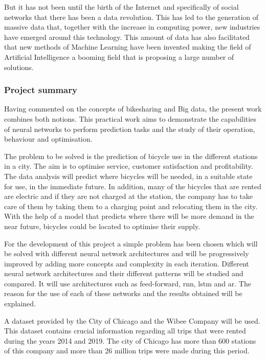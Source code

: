 But it has not been until the birth of the Internet and specifically of social networks that there has been a data revolution. This has led to the generation of massive data that, together with the increase in computing power, new industries have emerged around this technology. This amount of data has also facilitated that new methods of Machine Learning have been invented making the field of Artificial Intelligence a booming field that is proposing a large number of solutions.
\newline

\subsubsection{Project summary}

Having commented on the concepts of bikesharing and Big data, the present work combines both notions. This practical work aims to demonstrate the capabilities of neural networks to perform prediction tasks and the study of their operation, behaviour and optimisation.
\newline


The problem to be solved is the prediction of bicycle use in the different stations in a city. The aim is to optimise service, customer satisfaction and profitability. The data analysis will predict where bicycles will be needed, in a suitable state for use, in the immediate future. In addition, many of the bicycles that are rented are electric and if they are not charged at the station, the company has to take care of them by taking them to a charging point and relocating them in the city. With the help of a model that predicts where there will be more demand in the near future, bicycles could be located to optimise their supply.
\newline

\newline
For the development of this project a simple problem has been chosen which will be solved with different neural network architectures and will be progressively improved by adding more concepts and complexity in each iteration. Different neural network architectures and their different patterns will be studied and compared. It will use architectures such as feed-forward, \acrfull{rnn}, \acrfull{lstm} and \acrfull{ar}. The reason for the use of each of these networks and the results obtained will be explained.
\newline


A dataset provided by the City of Chicago and the Wibee Company will be used. This dataset contains crucial information regarding all trips that were rented during the years 2014 and 2019. The city of Chicago has more than 600 stations of this company and more than 26 million trips were made during this period.


